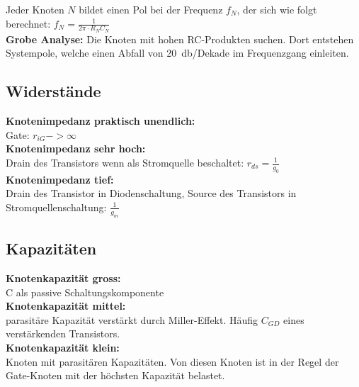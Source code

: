 \begin{minipage}[c]{0.45\textwidth}
	Jeder Knoten $N$ bildet einen Pol bei der Frequenz $f_N$, der sich wie folgt berechnet:
	$f_N=\frac{1}{2\pi\cdot R_N C_N}$\\[2ex]
	\textbf{Grobe Analyse:} Die Knoten mit hohen RC-Produkten suchen. Dort entstehen Systempole, welche einen Abfall von \SI{20}{\decibel/Dekade} im Frequenzgang einleiten.
	\subsection{Widerstände}
	\textbf{Knotenimpedanz praktisch unendlich:}\\
	Gate: $r_{iG} -> \infty$\\
	\textbf{Knotenimpedanz sehr hoch:}\\
	Drain des Transistors wenn als Stromquelle beschaltet: $r_{ds}= \frac{1}{g_0}$\\
	\textbf{Knotenimpedanz tief:}\\
	Drain des Transistor in Diodenschaltung, Source des Transistors in Stromquellenschaltung: $\frac{1}{g_m}$
	
	\subsection{Kapazitäten}
	\textbf{Knotenkapazität gross:}\\
	C als passive Schaltungskomponente\\
	\textbf{Knotenkapazität mittel:}\\
	parasitäre Kapazität verstärkt durch Miller-Effekt. Häufig $C_{GD}$ eines verstärkenden Transistors.\\
	\textbf{Knotenkapazität klein:}\\
	Knoten mit parasitären Kapazitäten. Von diesen Knoten ist in der Regel der Gate-Knoten mit der höchsten Kapazität belastet.
\end{minipage}
